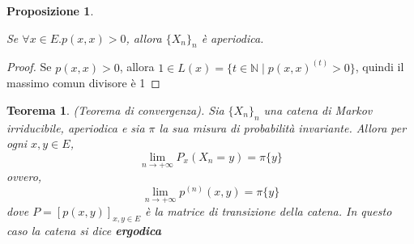 \documentclass{article}
\newtheorem{proposition}{Proposizione}[section]
\newtheorem{theorem}{Teorema}[section]
\begin{document}
\begin{proposition}
\label{prp:aperiodica}

    Se $\forall x\in E. p(x, x) > 0$, allora $\{X_n\}_n$ è aperiodica.
\end{proposition}
\begin{proof}
    Se $p(x, x) > 0$, allora $1 \in L(x) = \{t \in \mathbb{N} \mid p(x,x)^{(t)} > 0\}$, quindi il massimo comun divisore è 1
\end{proof}

\begin{theorem}
\label{thm:ergodic}
(Teorema di convergenza). Sia $\{{X}_n\}_n$ una catena di Markov irriducibile, aperiodica e sia $\pi$ la sua misura di probabilità invariante. Allora per ogni $x, y \in E$,
    \[
        \lim_{n \to +\infty} P_x(X_n = y) = \pi\{y\}
    \]
    ovvero,
    \[
        \lim_{n \to +\infty} p^{(n)}(x,y) = \pi\{y\}
    \]
    dove $P = [p(x,y)]_{x,y \in E}$ è la matrice di transizione della catena. In questo caso la catena si dice \textbf{ergodica}
\end{theorem}
\end{document}
